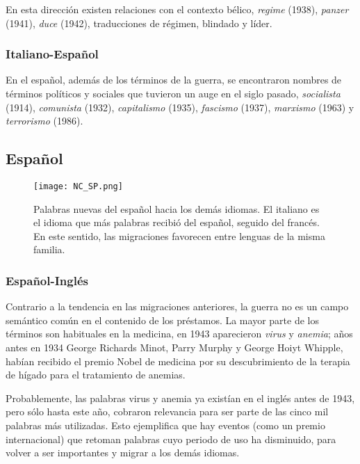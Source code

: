 En esta dirección existen relaciones con el contexto bélico,  \textit{regime} (1938), \textit{panzer} (1941), \textit{duce} (1942),  traducciones de régimen, blindado y líder.




\subsubsection*{Italiano-Español}%

En el español, además de los términos de la guerra, se encontraron nombres de términos políticos y sociales que tuvieron un auge en el siglo pasado,  \textit{socialista} (1914), \textit{comunista} (1932), \textit{capitalismo} (1935), \textit{fascismo} (1937),  \textit{marxismo} (1963) y \textit{terrorismo} (1986). 

\subsection{Español}%

\begin{figure} %
	\centering
	\texttt{[image: NC\_SP.png]}
	\caption{Palabras nuevas del español hacia los demás idiomas. El italiano es el idioma  que más palabras recibió del español, seguido del francés. En este sentido, las migraciones favorecen entre lenguas de la misma familia.}
	\label{fig.NC_SP}
\end{figure} %

\subsubsection*{Español-Inglés}%

Contrario a la tendencia en las migraciones anteriores, la guerra no es un campo semántico común en el contenido de los préstamos. La mayor parte de los términos son habituales en la medicina,  en 1943  aparecieron  \textit{virus} y \textit{anemia};  años antes en 1934 George Richards Minot, Parry Murphy y George Hoiyt Whipple, habían recibido el premio Nobel de medicina por su descubrimiento de la terapia de hígado para el tratamiento de anemias.   

Probablemente, las palabras virus y anemia ya existían en el inglés antes de 1943,  pero sólo hasta este año,  cobraron relevancia para ser parte de las cinco mil palabras más utilizadas. Esto ejemplifica que hay eventos (como un premio internacional) que retoman palabras cuyo periodo de uso  ha disminuido,  para volver a ser importantes y migrar a los demás idiomas.


